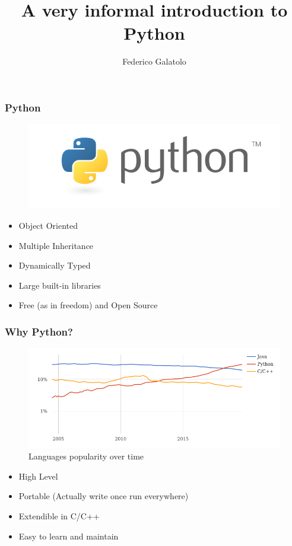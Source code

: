 \documentclass{beamer}
\title{A very informal introduction to Python}
\author{Federico Galatolo}
\date{}
\begin{document}
\frame{\titlepage}

\begin{frame}
    \frametitle{Python}
    \begin{figure}
        \includegraphics[scale=0.3]{imgs/logo.png}
    \end{figure}
    \begin{itemize}
        \item Object Oriented
        \item Multiple Inheritance
        \item Dynamically Typed
        \item Large built-in libraries
        \item Free (as in freedom) and Open Source
    \end{itemize}
\end{frame}

\begin{frame}
    \frametitle{Why Python?}
    \begin{figure}
        \includegraphics[scale=0.3]{imgs/stats.png}
        \caption{Languages popularity over time}
    \end{figure}
    \begin{itemize}
        \item High Level
        \item Portable (Actually write once run everywhere)
        \item Extendible in C/C++
        \item Easy to learn and maintain
    \end{itemize}
\end{frame}
\end{document}

